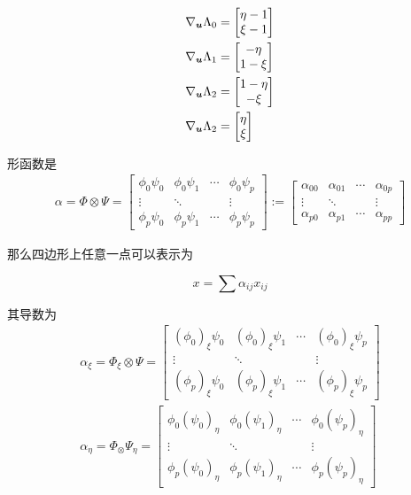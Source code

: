 \documentclass{article}
\begin{document}
\begin{align*}
    \nabla_{{\boldsymbol u}} \Lambda_0 &= \begin{bmatrix}
    								\eta-1 \\ \xi-1
								\end{bmatrix} \\
    \nabla_{{\boldsymbol u}} \Lambda_1 &= \begin{bmatrix}
    								-\eta \\ 1-\xi
								\end{bmatrix} \\
    \nabla_{{\boldsymbol u}} \Lambda_2 &= \begin{bmatrix}
    								1-\eta \\ -\xi
								\end{bmatrix} \\
    \nabla_{{\boldsymbol u}} \Lambda_2 &= \begin{bmatrix}
    								\eta \\  \xi
								\end{bmatrix}
\end{align*}

形函数是
\begin{align*}
 \alpha = \Phi \otimes \Psi = 
  \begin{bmatrix}
   \phi_0 \psi_0 & \phi_0 \psi_1  & \cdots & \phi_0 \psi_p \\ 
   \vdots        &   \ddots       &        &  \vdots       \\
   \phi_p \psi_0 &  \phi_p \psi_1 &  \cdots&  \phi_p\psi_p  
  \end{bmatrix}
  :=
  \begin{bmatrix}
   \alpha_{00}   & \alpha_{01}    & \cdots & \alpha_{0p} \\ 
   \vdots        &   \ddots       &        &  \vdots       \\
   \alpha_{p0}   &  \alpha_{p1}   &  \cdots&  \alpha_{pp}  
  \end{bmatrix}
\end{align*}

那么四边形上任意一点可以表示为

$$
x = \sum \alpha_{ij}x_{ij} 
$$

其导数为
\begin{align*}
   \alpha_\xi = \Phi_\xi \otimes \Psi = 
   \begin{bmatrix}
   (\phi_0)_\xi \psi_0 & (\phi_0)_\xi \psi_1  & \cdots & (\phi_0)_\xi \psi_p \\ 
   \vdots        &   \ddots       &        &  \vdots       \\
   (\phi_p)_\xi \psi_0 &  (\phi_p)_\xi \psi_1 &  \cdots&  (\phi_p)_\xi\psi_p  
   \end{bmatrix} \\
   \alpha_\eta = \Phi_ \otimes \Psi_\eta = 
   \begin{bmatrix}
   \phi_0 (\psi_0)_\eta & \phi_0 (\psi_1)_\eta  & \cdots & \phi_0 (\psi_p)_\eta \\ 
   \vdots        &   \ddots       &        &  \vdots       \\
   \phi_p (\psi_0)_\eta &  \phi_p (\psi_1)_\eta &  \cdots&  \phi_p (\psi_p)_\eta
   \end{bmatrix} 
\end{align*}
\end{document}
